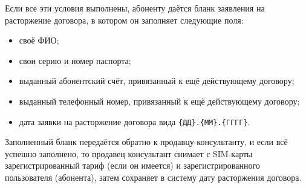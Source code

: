 Если все эти условия выполнены, абоненту даётся бланк заявления на расторжение договора, в котором он заполняет следующие поля:
\begin{itemize}
    \item своё ФИО;
    \item свои серию и номер паспорта;
    \item выданный абонентский счёт, привязанный к ещё действующему договору;
    \item выданный телефонный номер, привязанный к ещё действующему договору;
    \item дата заявки на расторжение договора вида \texttt{\{ДД\}.\{ММ\}.\{ГГГГ\}}.
\end{itemize}

Заполненный бланк передаётся обратно к продавцу-консультанту, и если всё успешно заполнено, то продавец консультант снимает с SIM-карты зарегистрированный тариф (если он имеется) и зарегистрированного пользователя (абонента), затем сохраняет в систему дату расторжения договора.





